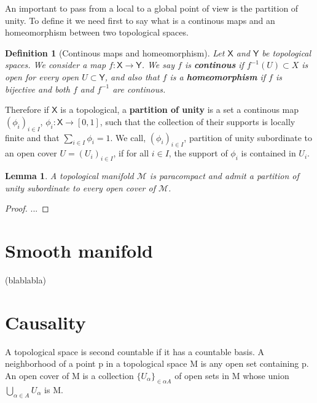 \documentclass[11pt]{book}
\newcommand{\Mcal}{\mathcal{M}}
\newcommand{\Xsf}{\mathsf{X}}
\newcommand{\Ysf}{\mathsf{Y}}
\theoremstyle{break}
\newtheorem{lemma}{Lemma}
\newtheorem{definition}{Definition}
\newtheorem{proof}{Proof}
\begin{document}
An important to pass from a local to a global point of view is the partition of unity. To define it we need first to say what is a continous maps and an homeomorphism between two topological spaces.


\begin{definition}[Continous maps and homeomorphism]
Let $\Xsf$ and $\Ysf$ be topological spaces. We consider a map $f : \Xsf \to \Ysf$. We say $f$ is \textbf{continous} if $f^{-1}(U) \subset X$ is open for every open $U \subset\Ysf$, and also that $f$ is a \textbf{homeomorphism} if $f$ is bijective and both $f$ and $f^{-1}$ are continous.
\end{definition}


Therefore if $\Xsf$ is a topological, a \textbf{partition of unity} is a set a continous map $(\phi_i)_{i \in I}$, $\phi_i : \Xsf \to [0,1]$, such that the collection of their supports is locally finite and that $\sum_{i\in I} \phi_i = 1$. We call, $(\phi_i)_{i \in I}$, partition of unity subordinate to an open cover $U=(U_i)_{i \in I}$, if for all $i \in I$, the support of $\phi_i$ is contained in $U_i$.


\begin{lemma}
A topological manifold $\Mcal$ is paracompact and admit a partition of unity subordinate to every open cover of $\Mcal$.
\end{lemma}


\begin{proof}
...
\end{proof}


\newpage

\section{Smooth manifold}

(blablabla)

\section{Causality}








A topological space is second countable if it has a countable basis. A
neighborhood of a point p in a topological space M is any open set containing p. An
open cover of M is a collection $\{U_\alpha\}_{\in\alpha A}$ of open sets in M whose union $\bigcup_{\alpha \in A} U_\alpha$ is M.
\end{document}

